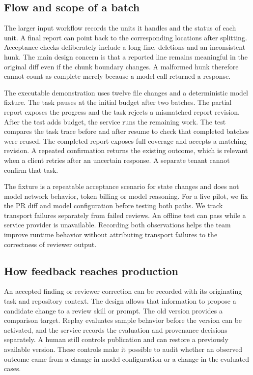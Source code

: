 \documentclass[journal,compsoc]{IEEEtran}
\begin{document}
\subsection{Flow and scope of a batch}
The larger input workflow records the units it handles and the status of each unit. A final report can point back to the corresponding locations after splitting. Acceptance checks deliberately include a long line, deletions and an inconsistent hunk. The main design concern is that a reported line remains meaningful in the original diff even if the chunk boundary changes. A malformed hunk therefore cannot count as complete merely because a model call returned a response.

The executable demonstration uses twelve file changes and a deterministic model fixture. The task pauses at the initial budget after two batches. The partial report exposes the progress and the task rejects a mismatched report revision. After the test adds budget, the service runs the remaining work. The test compares the task trace before and after resume to check that completed batches were reused. The completed report exposes full coverage and accepts a matching revision. A repeated confirmation returns the existing outcome, which is relevant when a client retries after an uncertain response. A separate tenant cannot confirm that task.

The fixture is a repeatable acceptance scenario for state changes and does not model network behavior, token billing or model reasoning. For a live pilot, we fix the PR diff and model configuration before testing both paths. We track transport failures separately from failed reviews. An offline test can pass while a service provider is unavailable. Recording both observations helps the team improve runtime behavior without attributing transport failures to the correctness of reviewer output.

\subsection{How feedback reaches production}
An accepted finding or reviewer correction can be recorded with its originating task and repository context. The design allows that information to propose a candidate change to a review skill or prompt. The old version provides a comparison target. Replay evaluates sample behavior before the version can be activated, and the service records the evaluation and provenance decisions separately. A human still controls publication and can restore a previously available version. These controls make it possible to audit whether an observed outcome came from a change in model configuration or a change in the evaluated cases.
\end{document}
